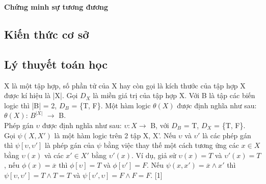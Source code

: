 \documentclass{article}
\begin{document}
	\begin{center}
		\textbf{\large Chứng minh sự tương đương}
	\end{center}
	\begin{flushleft}
		\section{Kiến thức cơ sở}
			\subsection{Lý thuyết toán học}
			X là một tập hợp, số phần tử của X hay còn gọi là kích thước của tập hợp X được kí hiệu là |X|. Gọi $D_X$ là miền giá trị của tập hợp X. Với B là tập các biến logic thì |B| = 2, $D_B$ = \{T, F\}. Một hàm logic $\theta(X)$ được định nghĩa như sau: $\theta(X)$: $B^{|X|}$ $\to$ B.\\
			Phép gán $\upsilon$ được định nghĩa như sau: $\upsilon: X \to$ B, với $D_B$ = T, $D_X$ = \{T, F\}.\\
			Gọi $\psi(X, X')$ là một hàm logic trên 2 tập X, X'. Nếu $\upsilon$ và $\upsilon'$ là các phép gán thì $\psi[\upsilon, \upsilon']$ là phép gán của $\psi$ bằng việc thay thế một cách tương ứng các $x \in X$ bằng $\upsilon(x)$ và các $x' \in X'$ bằng $\upsilon'(x)$. Ví dụ, giả sử $\upsilon(x) = T$ và $\upsilon'(x) = T$, nếu $\phi(x) = \overline x$ thì $\phi [\upsilon] = T$ và $\phi[\upsilon'] = F$. Nếu $\psi(x, x') = \overline x \land x'$ thì $\psi[\upsilon, \upsilon'] = T \land T = T$ và $\psi[\upsilon', \upsilon] = F \land F = F$. [1]

\end{flushleft}
\end{document}
